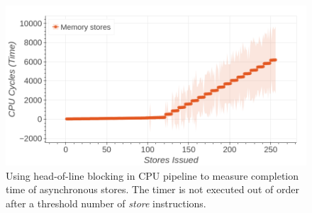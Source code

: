 \begin{figure}[!htb]
    \centering
    \includegraphics[width=\columnwidth]{figures/interconnect-sc/store-ops/measuring_store_time_before_microcode_update.png}
    \caption{Using head-of-line blocking in CPU pipeline to measure completion time of asynchronous stores.
    The timer is not executed out of order after a threshold number of \textit{store} instructions.}
    \label{fig:measuring-store-time-before-microcode-update}
\end{figure}

